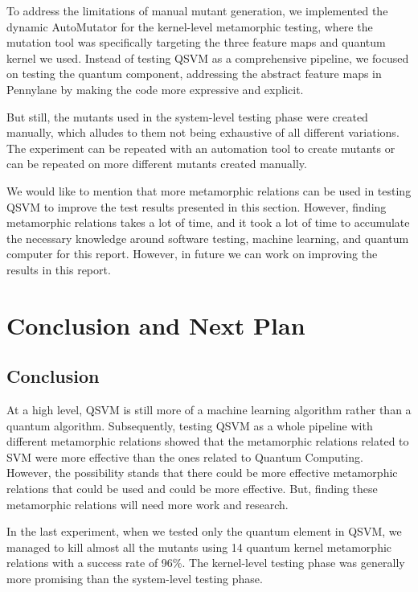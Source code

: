\documentclass[12pt,a4paper]{article}
\begin{document}
	To address the limitations of manual mutant generation, we implemented the dynamic AutoMutator for the kernel-level metamorphic testing, where the mutation tool was specifically targeting the three feature maps and quantum kernel we used. Instead of testing QSVM as a comprehensive pipeline, we focused on testing the quantum component, addressing the abstract feature maps in Pennylane by making the code more expressive and explicit.
	
	But still, the mutants used in the system-level testing phase were created manually, which alludes to them not being exhaustive of all different variations. The experiment can be repeated with an automation tool to create mutants or can be repeated on more different mutants created manually.
	
	We would like to mention that more metamorphic relations can be used in testing QSVM to improve the test results presented in this section. However, finding metamorphic relations takes a lot of time, and it took a lot of time to accumulate the necessary knowledge around software testing, machine learning, and quantum computer for this report. However, in future we can work on improving the results in this report.
	
	\section{Conclusion and Next Plan}
	\label{sec:conclusion}
	
	\subsection{Conclusion}
	
	At a high level, QSVM is still more of a machine learning algorithm rather than a quantum algorithm. Subsequently, testing QSVM as a whole pipeline with different metamorphic relations showed that the metamorphic relations related to SVM were more effective than the ones related to Quantum Computing. However, the possibility stands that there could be more effective metamorphic relations that could be used and could be more effective. But, finding these metamorphic relations will need more work and research. 
	
	In the last experiment, when we tested only the quantum element in QSVM, we managed to kill almost all the mutants using 14 quantum kernel metamorphic relations with a success rate of 96\%. The kernel-level testing phase was generally more promising than the system-level testing phase.
		
\end{document}
